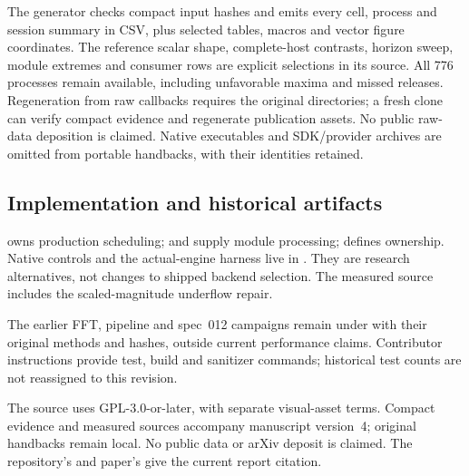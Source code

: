 The generator checks compact input hashes and emits every cell, process and
session summary in CSV, plus selected tables, macros and vector figure
coordinates. The reference scalar shape, complete-host contrasts, horizon
sweep, module extremes and consumer rows are explicit selections in its source.
All 776 processes remain available, including unfavorable maxima and missed
releases. Regeneration from raw callbacks requires the original directories;
a fresh clone can verify compact evidence and regenerate publication assets.
No public raw-data deposition is claimed. Native executables and SDK/provider
archives are omitted from portable handbacks, with their identities retained.

\subsection*{Implementation and historical artifacts}
 owns production scheduling;
 and  supply module
processing;  defines ownership.
Native controls and the actual-engine harness live in .
They are research alternatives, not changes to shipped backend selection.
The measured source includes the scaled-magnitude underflow repair.

The earlier FFT, pipeline and spec~012 campaigns remain under
 with their original methods and hashes, outside
current performance claims. Contributor instructions provide test, build and
sanitizer commands; historical test counts are not reassigned to this revision.

The source uses GPL-3.0-or-later, with separate visual-asset terms. Compact
evidence and measured sources accompany manuscript version~4; original
handbacks remain local. No public data or arXiv deposit is claimed. The
repository's  and paper's  give the
current report citation.
